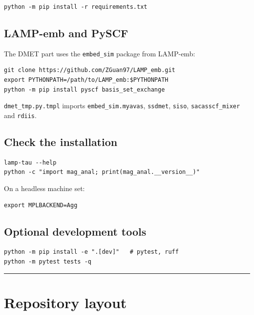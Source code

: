 \documentclass[11pt,a4paper]{article}
\begin{document}
\begin{lstlisting}
python -m pip install -r requirements.txt
\end{lstlisting}

\subsection{LAMP-emb and PySCF}\label{lamp-emb-and-pyscf}

The DMET part uses the \texttt{embed\_sim} package from LAMP-emb:

\begin{lstlisting}
git clone https://github.com/ZGuan97/LAMP_emb.git
export PYTHONPATH=/path/to/LAMP_emb:$PYTHONPATH
python -m pip install pyscf basis_set_exchange
\end{lstlisting}

\texttt{dmet\_tmp.py.tmpl} imports \texttt{embed\_sim.myavas},
\texttt{ssdmet}, \texttt{siso}, \texttt{sacasscf\_mixer} and
\texttt{rdiis}.

\subsection{Check the installation}\label{check-the-installation}

\begin{lstlisting}
lamp-tau --help
python -c "import mag_anal; print(mag_anal.__version__)"
\end{lstlisting}

On a headless machine set:

\begin{lstlisting}
export MPLBACKEND=Agg
\end{lstlisting}

\subsection{Optional development
tools}\label{optional-development-tools}

\begin{lstlisting}
python -m pip install -e ".[dev]"   # pytest, ruff
python -m pytest tests -q
\end{lstlisting}

\begin{center}\rule{0.5\linewidth}{0.4pt}\end{center}

\section{Repository layout}\label{repository-layout}
\end{document}
